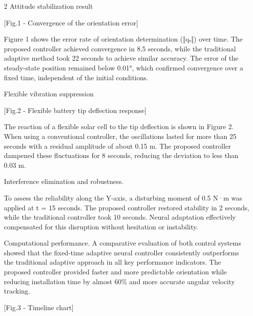 \begin{multicols}{2}
Attitude stabilization result

[Fig.1 - Convergence of the orientation error]

Figure 1 shows the error rate of orientation determination (‖qᵥ‖) over
time. The proposed controller achieved convergence in 8.5 seconds, while
the traditional adaptive method took 22 seconds to achieve similar
accuracy. The error of the steady-state position remained below
0.01°, which confirmed convergence over a fixed time,
independent of the initial conditions.

Flexible vibration suppression

[Fig.2 - Flexible battery tip deflection response]

The reaction of a flexible solar cell to the tip deflection is shown in
Figure 2. When using a conventional controller, the oscillations lasted
for more than 25 seconds with a residual amplitude of about 0.15 m. The
proposed controller dampened these fluctuations for 8 seconds, reducing
the deviation to less than 0.03 m.

Interference elimination and robustness.

To assess the reliability along the Y-axis, a disturbing moment of 0.5
N·m was applied at t = 15 seconds. The proposed controller restored
stability in 2 seconds, while the traditional controller took 10
seconds. Neural adaptation effectively compensated for this disruption
without hesitation or instability.

Computational performance. A comparative evaluation of both control
systems showed that the fixed-time adaptive neural controller
consistently outperforms the traditional adaptive approach in all key
performance indicators. The proposed controller provided faster and more
predictable orientation while reducing installation time by almost 60\%
and more accurate angular velocity tracking.
\end{multicols}

[Fig.3 - Timeline chart]

